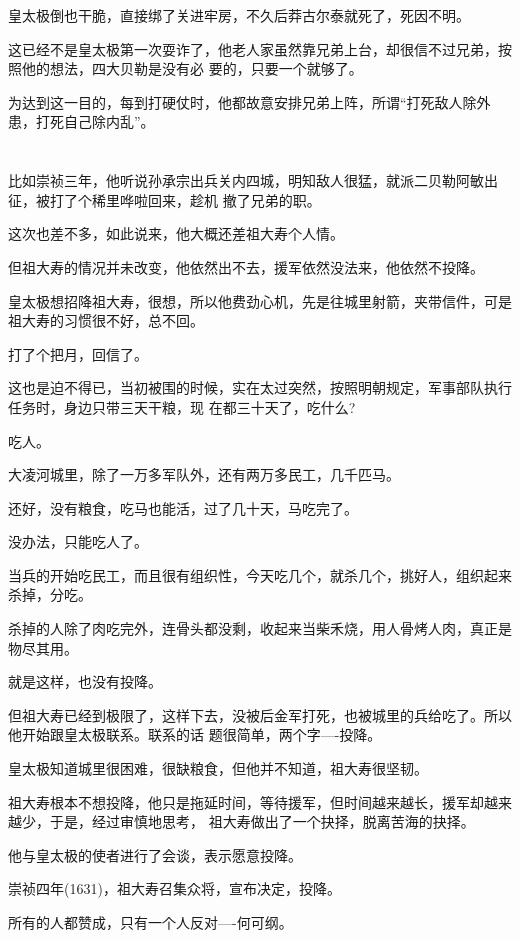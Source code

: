 \documentclass[11pt,a4paper,onecolumn]{article}
\begin{document}
皇太极倒也干脆，直接绑了关进牢房，不久后莽古尔泰就死了，死因不明。

这已经不是皇太极第一次耍诈了，他老人家虽然靠兄弟上台，却很信不过兄弟，按照他的想法，四大贝勒是没有必
要的，只要一个就够了。

为达到这一目的，每到打硬仗时，他都故意安排兄弟上阵，所谓``打死敌人除外患，打死自己除内乱''。

\section[\thesection]{}

比如崇祯三年，他听说孙承宗出兵关内四城，明知敌人很猛，就派二贝勒阿敏出征，被打了个稀里哗啦回来，趁机
撤了兄弟的职。

这次也差不多，如此说来，他大概还差祖大寿个人情。

但祖大寿的情况并未改变，他依然出不去，援军依然没法来，他依然不投降。

皇太极想招降祖大寿，很想，所以他费劲心机，先是往城里射箭，夹带信件，可是祖大寿的习惯很不好，总不回。

打了个把月，回信了。

这也是迫不得已，当初被围的时候，实在太过突然，按照明朝规定，军事部队执行任务时，身边只带三天干粮，现
在都三十天了，吃什么?

吃人。

大凌河城里，除了一万多军队外，还有两万多民工，几千匹马。

还好，没有粮食，吃马也能活，过了几十天，马吃完了。

没办法，只能吃人了。

当兵的开始吃民工，而且很有组织性，今天吃几个，就杀几个，挑好人，组织起来杀掉，分吃。

杀掉的人除了肉吃完外，连骨头都没剩，收起来当柴禾烧，用人骨烤人肉，真正是物尽其用。

就是这样，也没有投降。

但祖大寿已经到极限了，这样下去，没被后金军打死，也被城里的兵给吃了。所以他开始跟皇太极联系。联系的话
题很简单，两个字----投降。

皇太极知道城里很困难，很缺粮食，但他并不知道，祖大寿很坚韧。

祖大寿根本不想投降，他只是拖延时间，等待援军，但时间越来越长，援军却越来越少，于是，经过审慎地思考，
祖大寿做出了一个抉择，脱离苦海的抉择。

他与皇太极的使者进行了会谈，表示愿意投降。

崇祯四年(1631)，祖大寿召集众将，宣布决定，投降。

所有的人都赞成，只有一个人反对----何可纲。
\end{document}
